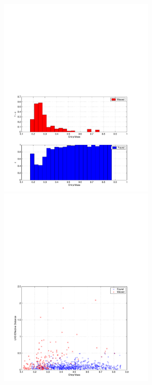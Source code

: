 \begin{figure}[p]
\begin{center}
\includegraphics[width=0.7\textwidth]{figures/result/mchirp_eff} \\
\includegraphics[width=0.7\textwidth]{figures/result/mchirp_found_missed}
\end{center}
\caption[Search Efficiency as a Function of Chirp Mass]{%
}
\end{figure}
